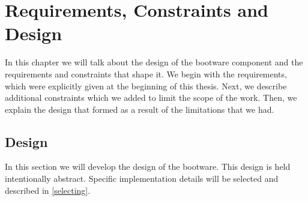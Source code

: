 \chapter{Requirements, Constraints and Design}

In this chapter we will talk about the design of the bootware component and the requirements and constraints that shape it.
We begin with the requirements, which were explicitly given at the beginning of this thesis.
Next, we describe additional constraints which we added to limit the scope of the work.
Then, we explain the design that formed as a result of the limitations that we had.




\section{Design}
\label{design}

In this section we will develop the design of the bootware.
This design is held intentionally abstract.
Specific implementation details will be selected and described in \autoref{selecting}.






